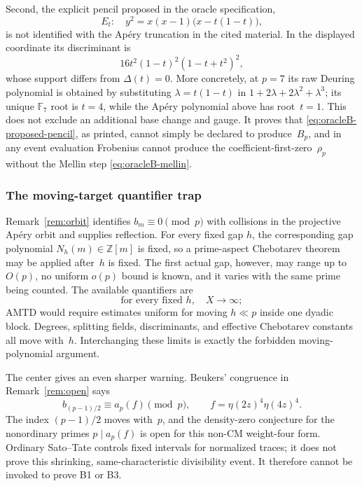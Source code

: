 Second, the explicit pencil proposed in the oracle specification,
\begin{equation}
 E_t:\quad y^2=x(x-1)\bigl(x-t(1-t)\bigr),
 \label{eq:oracleB-proposed-pencil}
\end{equation}
is not identified with the Ap\'ery truncation in the cited material.  In
the displayed coordinate its discriminant is
\[
 16t^2(1-t)^2(1-t+t^2)^2,
\]
whose support differs from $\Delta(t)=0$.  More concretely, at $p=7$ its
raw Deuring polynomial is obtained by substituting
$\lambda=t(1-t)$ in
$1+2\lambda+2\lambda^2+\lambda^3$; its unique $\mathbb F_7$ root is
$t=4$, while the Ap\'ery polynomial above has root~$t=1$.  This does not
exclude an additional base change and gauge.  It proves that
\eqref{eq:oracleB-proposed-pencil}, as printed, cannot simply be declared
to produce~$B_p$, and in any event evaluation Frobenius cannot produce the
coefficient-first-zero~$\rho_p$ without the Mellin step
\eqref{eq:oracleB-mellin}.

\subsubsection{The moving-target quantifier trap}

Remark~\ref{rem:orbit} identifies $b_m\equiv0\pmod p$ with collisions in
the projective Ap\'ery orbit and supplies reflection.  For every fixed gap
$h$, the corresponding gap polynomial $N_h(m)\in\mathbb Z[m]$ is fixed,
so a prime-aspect Chebotarev theorem may be applied after~$h$ is fixed.
The first actual gap, however, may range up to $O(p)$, no uniform
$o(p)$ bound is known, and it varies with the same prime being counted.
The available quantifiers are
\[
 \text{for every fixed }h,\quad X\longrightarrow\infty;
\]
AMTD would require estimates uniform for moving $h\ll p$ inside
one dyadic block.  Degrees, splitting fields, discriminants, and effective
Chebotarev constants all move with~$h$.  Interchanging these limits is
exactly the forbidden moving-polynomial argument.

The center gives an even sharper warning.  Beukers' congruence in
Remark~\ref{rem:open} says
\[
 b_{(p-1)/2}\equiv a_p(f)\pmod p,
 \qquad f=\eta(2z)^4\eta(4z)^4.
\]
The index $(p-1)/2$ moves with~$p$, and the density-zero conjecture for
the nonordinary primes $p\mid a_p(f)$ is open for this non-CM weight-four
form.  Ordinary Sato--Tate controls fixed intervals for normalized traces;
it does not prove this shrinking, same-characteristic divisibility event.
It therefore cannot be invoked to prove B1 or B3.

